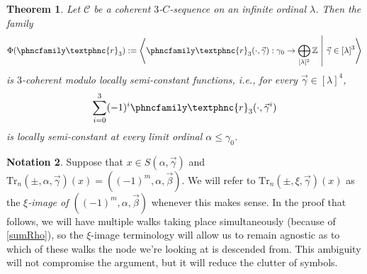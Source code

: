 \documentclass{amsart}
\newtheorem{theorem}{Theorem}
\numberwithin{theorem}{section}
\theoremstyle{definition}
\newtheorem{notation}[theorem]{Notation}
\newcommand{\bb}{\mathbb}
\newcommand{\ra}{\rightarrow}
\newcommand{\C}{\mathcal{C}}
\newcommand{\Tr}{\mathrm{Tr}}
\newcommand{\resh}{{\phncfamily\textphnc{r}}}
\begin{document}
\begin{theorem}\label{main3}
Let $\C$ be a coherent $3$-$C$-sequence on an infinite ordinal $\lambda$. Then the family
\[
\Phi(\resh_3):=\left\langle\resh_3(\cdot,\vec\gamma):\gamma_0 \ra \bigoplus_{[\lambda]^{2}} \bb{Z} \ \middle| \ \vec\gamma\in[\lambda]^3\right\rangle
\]
is $3$-coherent modulo locally semi-constant functions, i.e., for every $\vec\gamma\in[\lambda]^{4}$,
\begin{equation}\label{sumRho}
\sum_{i=0}^3(-1)^i\resh_3(\cdot,\vec\gamma^i)
\end{equation}
is locally semi-constant at every limit ordinal $\alpha\le\gamma_0$.
\end{theorem}


\begin{notation}\label{xiImage}
Suppose that $x\in S(\alpha,\vec\gamma)$ and $\Tr_n(\pm,\alpha,\vec\gamma)(x)=((-1)^m,\alpha,\vec\beta)$. We will refer to $\Tr_n(\pm,\xi,\vec\gamma)(x)$ as the \emph{$\xi$-image of $((-1)^m,\alpha,\vec\beta)$} whenever this makes sense. In the proof that follows, we will have multiple walks taking place simultaneously (because of \eqref{sumRho}), so the $\xi$-image terminology will allow us to remain agnostic as to which of these walks the node we're looking at is descended from. This ambiguity will not compromise the argument, but it will reduce the clutter of symbols.
\end{notation}
\end{document}
